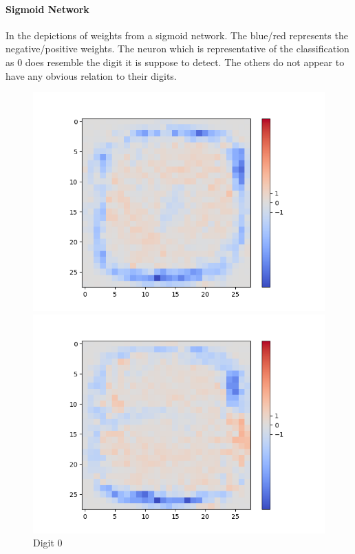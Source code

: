 \paragraph{Sigmoid Network}
In the depictions of weights from a sigmoid network. The blue/red represents the negative/positive weights. The neuron which is representative of the classification as 0 does resemble the digit it is suppose to detect. The others do not appear to have any obvious relation to their digits.

\begin{figure}[H]
	\captionsetup{labelformat=empty}
	\centering
	\begin{minipage}[b]{0.19\textwidth}
		\includegraphics[width=\textwidth]{Sigmoid(NO-Hidden)/Layer0-Neuron-0.png}
		\caption{Digit 0}
	\end{minipage}
	\begin{minipage}[b]{0.19\textwidth}
		\includegraphics[width=\textwidth]{Sigmoid(NO-Hidden)/Layer0-Neuron-2.png}

\end{minipage}
\end{figure}
